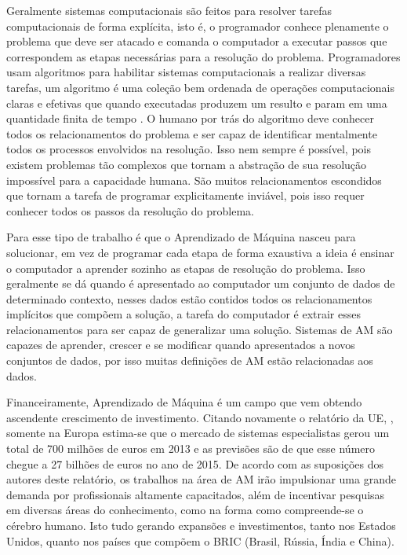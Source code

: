 Geralmente sistemas computacionais são feitos para resolver tarefas computacionais de forma explícita, isto é, o programador conhece plenamente o problema que deve ser atacado e comanda o computador a executar passos que correspondem as etapas necessárias para a resolução do problema. Programadores usam algoritmos para habilitar sistemas computacionais a realizar diversas tarefas, um algoritmo é uma coleção bem ordenada de operações computacionais claras e efetivas que quando executadas produzem um resulto e param em uma quantidade finita de tempo \cite{schn1995}. O humano por trás do algoritmo deve conhecer todos os relacionamentos do problema e ser capaz de identificar mentalmente todos os processos envolvidos na resolução. Isso nem sempre é possível, pois existem problemas tão complexos que tornam a abstração de sua resolução impossível para a capacidade humana. São muitos relacionamentos escondidos que tornam a tarefa de programar explicitamente inviável, pois isso requer conhecer todos os passos da resolução do problema.

Para esse tipo de trabalho é que o Aprendizado de Máquina nasceu para solucionar, em vez de programar cada etapa de forma exaustiva a ideia é ensinar o computador a aprender sozinho as etapas de resolução do problema. Isso geralmente se dá quando é apresentado ao computador um conjunto de dados de determinado contexto, nesses dados estão contidos todos os relacionamentos implícitos que compõem a solução, a tarefa do computador é extrair esses relacionamentos para ser capaz de generalizar uma solução. Sistemas de AM são capazes de aprender, crescer e se modificar quando apresentados a novos conjuntos de dados, por isso muitas definições de AM estão relacionadas aos dados.

Financeiramente, Aprendizado de Máquina é um campo que vem obtendo ascendente crescimento de investimento. Citando novamente o relatório da UE, , somente na Europa estima-se que o mercado de sistemas especialistas gerou um total de 700 milhões de euros em 2013 e as previsões são de que esse número chegue a 27 bilhões de euros no ano de 2015. De acordo com as suposições dos autores deste relatório, os trabalhos na área de AM irão impulsionar uma grande demanda por profissionais altamente capacitados, além de incentivar pesquisas em diversas áreas do conhecimento, como na forma como compreende-se o cérebro humano. Isto tudo gerando expansões e investimentos, tanto nos Estados Unidos, quanto nos países que compõem o BRIC (Brasil, Rússia, Índia e China). 




